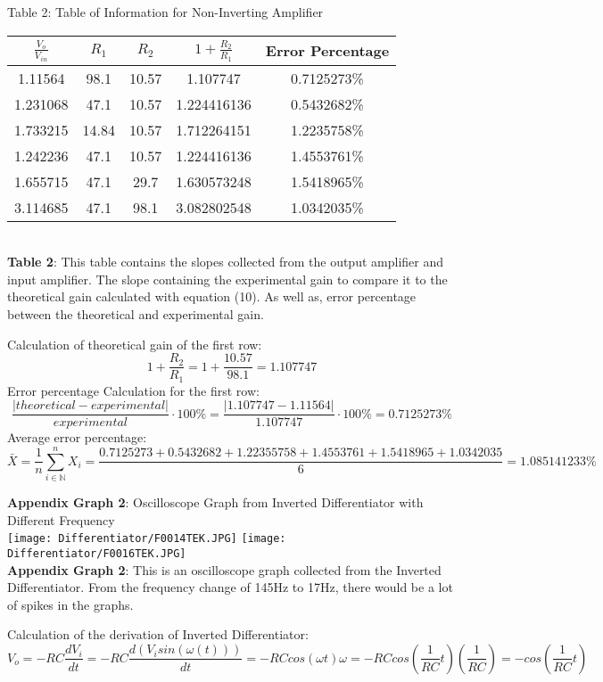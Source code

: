 \documentclass[11pt]{article}
\def\N{{\mathbb{N}}}
\begin{document}
\begin{center}
\caption{Table 2: Table of Information for Non-Inverting Amplifier} 
 \begin{tabular}{||c c c c c||} 
 \hline
 $\frac{V_o}{V_{in}}$ & $R_1$ & $R_2$ & $1+\frac{R_2}{R_1}$ & Error Percentage \\ [0.5ex] 
 \hline\hline
 1.11564 & 98.1 & 10.57 & 1.107747 & 0.7125273\%\\ 
 \hline
 1.231068 & 47.1 & 10.57 & 1.224416136 & 0.5432682\%\\
 \hline
 1.733215 & 14.84 & 10.57 & 1.712264151 & 1.2235758\%\\
 \hline
 1.242236 & 47.1 & 10.57 & 1.224416136 & 1.4553761\%\\
 \hline
 1.655715 & 47.1 & 29.7 & 1.630573248 & 1.5418965\%\\
 \hline
 3.114685 & 47.1 & 98.1 & 3.082802548 & 1.0342035\%\\ [1ex] 
 \hline
\end{tabular}
\\\textbf{Table 2}: This table contains the slopes collected from the output amplifier and input amplifier. The slope containing the experimental gain to compare it to the theoretical gain calculated with equation (10). As well as, error percentage between the theoretical and experimental gain.
\end{center}
Calculation of theoretical gain of the first row:
\[1+\frac{R_2}{R_1}=1+\frac{10.57}{98.1}=1.107747\]
Error percentage Calculation for the first row:
\[\frac{|theoretical-experimental|}{experimental}\cdot 100\% =\frac{|1.107747-1.11564|}{1.107747}\cdot 100\%=0.7125273\%\]
Average error percentage:
\[\bar X= \frac{1}{n}\sum^n_{i\in\N}X_i=\frac{0.7125273+0.5432682+1.22355758+1.4553761+1.5418965+1.0342035}{6}=1.085141233\%\]
\newpage
\begin{center}
    \textbf{Appendix Graph 2}: Oscilloscope Graph from Inverted Differentiator with Different Frequency\\
    \texttt{[image: Differentiator/F0014TEK.JPG]}
    \texttt{[image: Differentiator/F0016TEK.JPG]}
    \\\textbf{Appendix Graph 2}: This is an oscilloscope graph collected from the Inverted Differentiator. From the frequency change of 145Hz to 17Hz, there would be a lot of spikes in the graphs. 
\end{center}

Calculation of the derivation of Inverted Differentiator:
\[V_o=-RC\frac{dV_i}{dt}=-RC\frac{d(V_isin(\omega(t)))}{dt}=-RCcos(\omega t)\omega=-RCcos(\frac{1}{RC}t)(\frac{1}{RC})=-cos(\frac{1}{RC}t)\]
\end{document}
